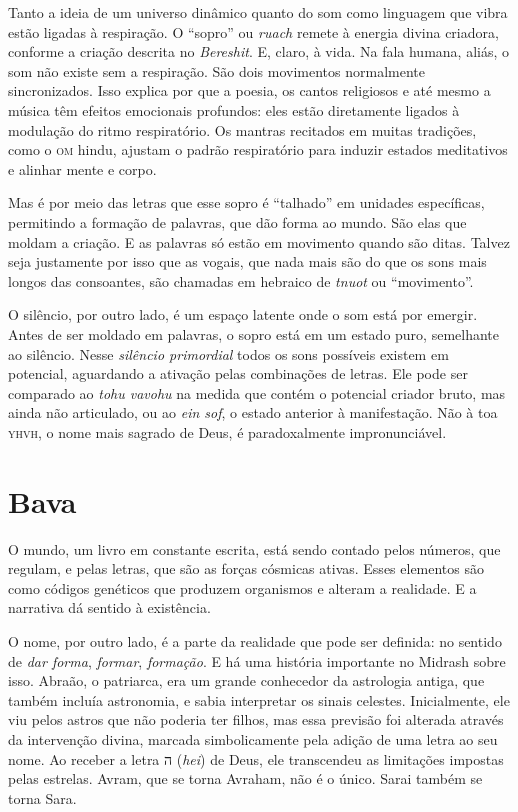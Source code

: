 
Tanto a ideia de um universo dinâmico quanto do som como linguagem que vibra estão ligadas à respiração. O ``sopro'' ou \textit{ruach} remete à energia divina criadora, conforme a criação descrita no \textit{Bereshit}. E, claro, à vida. Na fala humana, aliás, o som não existe sem a respiração. São dois movimentos normalmente sincronizados. Isso explica por que a poesia, os cantos religiosos e até mesmo a música têm efeitos emocionais profundos: eles estão diretamente ligados à modulação do ritmo respiratório. Os mantras recitados em muitas tradições, como o \textsc{om} hindu, ajustam o padrão respiratório para induzir estados meditativos e alinhar mente e corpo.

Mas é por meio das letras que esse sopro é ``talhado'' em unidades específicas, permitindo a formação de palavras, que dão forma ao mundo. São elas que moldam a criação. E as palavras só estão em movimento quando são ditas. Talvez seja justamente por isso que as vogais, que nada mais são do que os sons mais longos das consoantes, são chamadas em hebraico de \textit{tnuot} ou ``movimento''.


O silêncio, por outro lado, é um espaço latente onde o som está por emergir. Antes de ser moldado em palavras, o sopro está em um estado puro, semelhante ao silêncio. Nesse \textit{silêncio primordial} todos os sons possíveis existem em potencial, aguardando a ativação pelas combinações de letras. Ele pode ser comparado ao \textit{tohu vavohu} na medida que contém o potencial criador bruto, mas ainda não articulado, ou ao \textit{ein sof}, o estado anterior à manifestação. Não à toa \textsc{yhvh}, o nome mais sagrado de Deus, é paradoxalmente impronunciável.

\chapter*{Bava \smallskip{}}

O mundo, um livro em constante escrita, está sendo contado pelos números, que regulam, e pelas letras, que são as forças cósmicas ativas. Esses elementos são como códigos genéticos que produzem organismos e alteram a realidade. E a narrativa dá sentido à existência. 

O nome, por outro lado, é a parte da realidade que pode ser definida: no sentido de \textit{dar forma}, \textit{formar}, \textit{formação}. E há uma história importante no Midrash sobre isso. Abraão, o patriarca, era um grande conhecedor da astrologia antiga, que também incluía astronomia, e sabia interpretar os sinais celestes. Inicialmente, ele viu pelos astros que não poderia ter filhos, mas essa previsão foi alterada através da intervenção divina, marcada simbolicamente pela adição de uma letra ao seu nome. Ao receber a letra {\frank ה} (\textit{hei}) de Deus, ele transcendeu as limitações impostas pelas estrelas. Avram, que se torna Avraham, não é o único. Sarai também se torna Sara.

